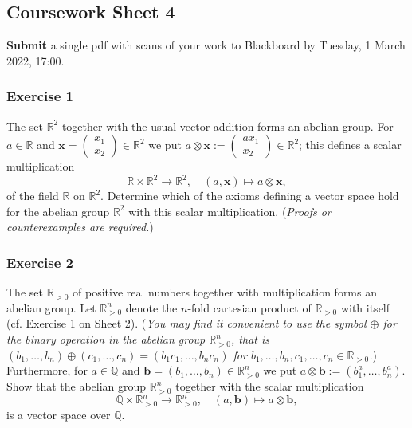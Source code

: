 \documentclass[
  12pt,
  a4paper,
  twoside]{article}
\theoremstyle{plain}
\theoremstyle{definition}
\begin{document}
\hypertarget{coursework-sheet-4}{%
\subsection{Coursework Sheet 4}\label{coursework-sheet-4}}

\textbf{Submit} a single pdf with scans of your work to Blackboard by Tuesday, 1 March 2022, 17:00.

\hypertarget{exercise-1-3}{%
\subsubsection*{Exercise 1}\label{exercise-1-3}}

The set \(\mathbb{R}^2\) together with the usual vector addition forms an abelian
group. For \(a \in \mathbb{R}\) and \(\mathbf{x} = \left(\begin{array}{c}x_1\\x_2\end{array}\right) \in \mathbb{R}^2\) we
put
\(a \otimes \mathbf{x} := \left(\begin{array}{c} ax_1\\ x_2\end{array}\right) \in \mathbb{R}^2\);
this defines a scalar multiplication
\[\mathbb{R} \times \mathbb{R}^2 \rightarrow \mathbb{R}^2, \quad (a, \mathbf{x}) \mapsto a
\otimes \mathbf{x},\] of the field \(\mathbb{R}\) on \(\mathbb{R}^2\). Determine
which of the axioms defining a vector space hold for the
abelian group \(\mathbb{R}^2\) with this scalar multiplication.
(\emph{Proofs or counterexamples are required.})

\hypertarget{exercise-2-3}{%
\subsubsection*{Exercise 2}\label{exercise-2-3}}

The set \(\mathbb{R}_{>0}\) of positive real numbers together with
multiplication forms an abelian group. Let \(\mathbb{R}_{>0}^n\) denote
the \(n\)-fold cartesian product of \(\mathbb{R}_{>0}\) with itself (cf.
Exercise 1 on Sheet 2). (\emph{You may find it convenient to use
the symbol \(\oplus\) for the binary operation in the abelian
group \(\mathbb{R}_{>0}^n\), that is \((b_1, \ldots, b_n) \oplus (c_1, \ldots, c_n) = (b_1 c_1, \ldots, b_n c_n)\) for \(b_1, \ldots, b_n, c_1, \ldots, c_n \in \mathbb{R}_{>0}\).}) Furthermore, for \(a \in \mathbb{Q}\) and \(\mathbf{b} = (b_1, \ldots, b_n) \in \mathbb{R}_{>0}^n\) we put
\(a \otimes \mathbf{b} := (b_1^a, \dots, b_n^a)\). Show that the
abelian group \(\mathbb{R}_{>0}^n\) together with the scalar multiplication
\[\mathbb{Q} \times \mathbb{R}_{>0}^n \rightarrow
\mathbb{R}_{>0}^n, \quad (a, \mathbf{b}) \mapsto a \otimes \mathbf{b},\] is a
vector space over \(\mathbb{Q}\).
\end{document}
